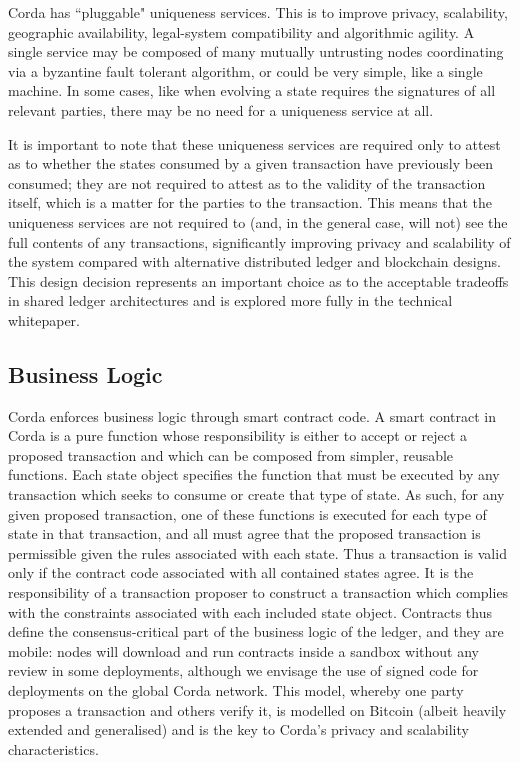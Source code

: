 \documentclass{article}
\begin{document}
Corda has ``pluggable" uniqueness services. This is to improve privacy, scalability, geographic availability, legal-system compatibility\cite{EUC} and algorithmic agility. A single service may be composed of many mutually untrusting nodes coordinating via a byzantine fault tolerant algorithm, or could be very simple, like a single machine. In some cases, like when evolving a state requires the signatures of all relevant parties, there may be no need for a uniqueness service at all.

It is important to note that these uniqueness services are required only to attest as to whether the states consumed by a given transaction have previously been consumed; they are not required to attest as to the validity of the transaction itself, which is a matter for the parties to the transaction. This means that the uniqueness services are not required to (and, in the general case, will not) see the full contents of any transactions, significantly improving privacy and scalability of the system compared with alternative distributed ledger and blockchain designs.  This design decision represents an important choice as to the acceptable tradeoffs in shared ledger architectures and is explored more fully in the technical whitepaper.

\subsection{Business Logic}
Corda enforces business logic through smart contract code. A smart contract in Corda is a pure function whose responsibility is either to accept or reject a proposed transaction and which can be composed from simpler, reusable functions. Each state object specifies the function that must be executed by any transaction which seeks to consume or create that type of state. As such, for any given proposed transaction, one of these functions is executed for each type of state in that transaction, and all must agree that the proposed transaction is permissible given the rules associated with each state. Thus a transaction is valid only if the contract code associated with all contained states agree. It is the responsibility of a transaction proposer to construct a transaction which complies with the constraints associated with each included state object. Contracts thus define the consensus-critical part of the business logic of the ledger, and they are mobile: nodes will download and run contracts inside a sandbox without any review in some deployments, although we envisage the use of signed code for deployments on the global Corda network. This model, whereby one party proposes a transaction and others verify it, is modelled on Bitcoin (albeit heavily extended and generalised) and is the key to Corda's privacy and scalability characteristics.
\end{document}
